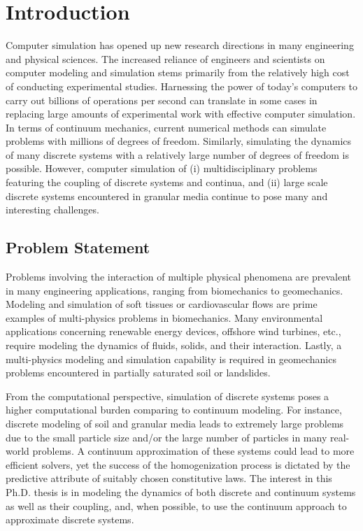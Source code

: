 \chapter{Introduction}
\label{chap:introduction}
Computer simulation has opened up new research directions in many engineering and physical sciences. The increased reliance of engineers and scientists on computer modeling and simulation stems primarily from the relatively high cost of conducting experimental studies. Harnessing the power of today's computers to carry out billions of operations per second can translate in some cases in replacing large amounts of experimental work with effective computer simulation. In terms of continuum mechanics, current numerical methods can simulate problems with millions of degrees of freedom. Similarly, simulating the dynamics of many discrete systems with a relatively large number of degrees of freedom is possible. However, computer simulation of (i) multidisciplinary problems featuring the coupling of discrete systems and continua, and (ii) large scale discrete systems encountered in granular media continue to pose many and interesting challenges.

\section{Problem Statement}
Problems involving the interaction of multiple physical phenomena are prevalent in many engineering applications, ranging from biomechanics to geomechanics. Modeling and simulation of soft tissues or cardiovascular flows are prime examples of multi-physics problems in biomechanics. Many environmental applications concerning renewable energy devices, offshore wind turbines, etc., require modeling the dynamics of fluids, solids, and their interaction. Lastly, a multi-physics modeling and simulation capability is required in geomechanics problems encountered in partially saturated soil or landslides.   

From the computational perspective, simulation of discrete systems poses a higher computational burden comparing to continuum modeling. For instance, discrete modeling of soil and granular media leads to extremely large problems due to the small particle size and/or the large number of particles in many real-world problems. A continuum approximation of these systems could lead to more efficient solvers, yet the success of the homogenization process is dictated by the predictive attribute of suitably chosen constitutive laws. The interest in this Ph.D. thesis is in modeling the dynamics of both discrete and continuum systems as well as their coupling, and, when possible, to use the continuum approach to approximate discrete systems.

